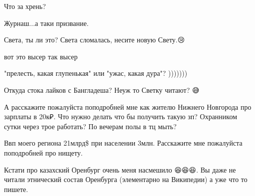\begin{itemize}
Что за хрень?

 
Журнаш...а таки призвание.💐

 
Света, ты ли это? Света сломалась, несите новую Свету.😢💩🤡

 
вот это высер так высер🤦

 
"прелесть, какая глупенькая" или "ужас, какая дура"? )))))))

 
Откуда стока лайков с Бангладеша? Неуж то Светку читают? 😅

 

А расскажите пожалуйста поподробней мне как жителю Нижнего Новгорода про
зарплаты в 20к₽. Что нужно делать что бы получить такую зп? Охранником сутки
через трое работать? По вечерам полы в тц мыть?

Ввп моего региона 21млрд\$ при населении 3млн. Расскажите мне пожалуйста
поподробней про нищету.

Кстати про казахский Оренбург очень меня насмешило 😆😆😆. Вы даже не читали
этнический состав Оренбурга (элементарно на Википедии) а уже что то пишете.


\end{itemize}
